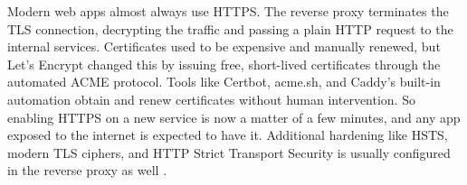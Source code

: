 Modern web apps almost always use HTTPS. The reverse proxy terminates the TLS connection, decrypting the traffic and passing a plain HTTP request to the internal services. Certificates used to be expensive and manually renewed, but Let's Encrypt changed this by issuing free, short-lived certificates through the automated ACME protocol. Tools like Certbot, acme.sh, and Caddy's built-in automation obtain and renew certificates without human intervention. So enabling HTTPS on a new service is now a matter of a few minutes, and any app exposed to the internet is expected to have it. Additional hardening like HSTS, modern TLS ciphers, and HTTP Strict Transport Security is usually configured in the reverse proxy as well \autocite{lets_encrypt_automation_2024}.